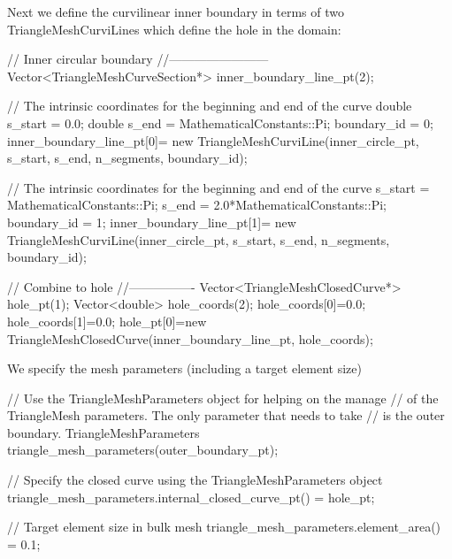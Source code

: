 Next we define the curvilinear inner boundary in terms of two {\ttfamily Triangle\+Mesh\+Curvi\+Lines} which define the hole in the domain\+:


\begin{DoxyCodeInclude}

 \textcolor{comment}{// Inner circular boundary}
 \textcolor{comment}{//------------------------}
 Vector<TriangleMeshCurveSection*> inner\_boundary\_line\_pt(2);

 \textcolor{comment}{// The intrinsic coordinates for the beginning and end of the curve}
 \textcolor{keywordtype}{double} s\_start = 0.0;
 \textcolor{keywordtype}{double} s\_end   = MathematicalConstants::Pi;
 boundary\_id = 0;
 inner\_boundary\_line\_pt[0]=
  \textcolor{keyword}{new} TriangleMeshCurviLine(inner\_circle\_pt,
                            s\_start,
                            s\_end,
                            n\_segments,
                            boundary\_id);

 \textcolor{comment}{// The intrinsic coordinates for the beginning and end of the curve}
 s\_start = MathematicalConstants::Pi;
 s\_end   = 2.0*MathematicalConstants::Pi;
 boundary\_id = 1;
 inner\_boundary\_line\_pt[1]=
  \textcolor{keyword}{new} TriangleMeshCurviLine(inner\_circle\_pt,
                            s\_start,
                            s\_end,
                            n\_segments,
                            boundary\_id);


 \textcolor{comment}{// Combine to hole}
 \textcolor{comment}{//----------------}
 Vector<TriangleMeshClosedCurve*> hole\_pt(1);
 Vector<double> hole\_coords(2);
 hole\_coords[0]=0.0;
 hole\_coords[1]=0.0;
 hole\_pt[0]=\textcolor{keyword}{new} TriangleMeshClosedCurve(inner\_boundary\_line\_pt,
                                        hole\_coords);

\end{DoxyCodeInclude}


We specify the mesh parameters (including a target element size)


\begin{DoxyCodeInclude}


 \textcolor{comment}{// Use the TriangleMeshParameters object for helping on the manage}
 \textcolor{comment}{// of the TriangleMesh parameters. The only parameter that needs to take}
 \textcolor{comment}{// is the outer boundary.}
 TriangleMeshParameters triangle\_mesh\_parameters(outer\_boundary\_pt);

 \textcolor{comment}{// Specify the closed curve using the TriangleMeshParameters object}
 triangle\_mesh\_parameters.internal\_closed\_curve\_pt() = hole\_pt;

 \textcolor{comment}{// Target element size in bulk mesh}
 triangle\_mesh\_parameters.element\_area() = 0.1;

\end{DoxyCodeInclude}


